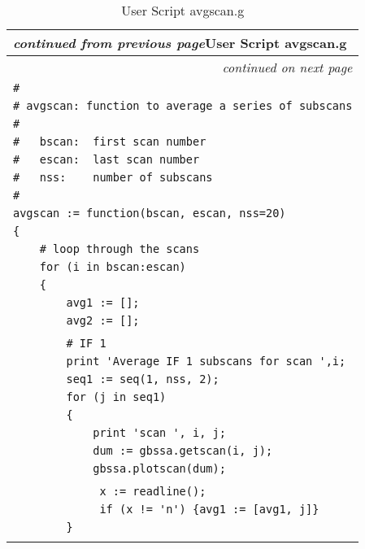 \setlongtables
\begin{longtable}[c]{|l|}
\caption{User Script avgscan.g}\label{avgscan} \\
\cline{1-1}
\endfirsthead
\multicolumn{1}{l}{\hspace{9mm}\footnotesize{\slshape
 continued from previous page}\hfill{User Script avgscan.g}} \\
\cline{1-1}
\endhead
\cline{1-1}
\multicolumn{1}{r}{\small \slshape
 continued on next page} \\
\endfoot
\cline{1-1}
\endlastfoot
{\slshape\small}
\verb|#   | \\
\verb|# avgscan: function to average a series of subscans| \\
\verb|#   | \\
\verb|#   bscan:  first scan number| \\
\verb|#   escan:  last scan number| \\
\verb|#   nss:    number of subscans| \\
\verb|#| \\
\verb|avgscan := function(bscan, escan, nss=20)| \\
\verb|{| \\
\verb|    # loop through the scans| \\
\verb|    for (i in bscan:escan)| \\
\verb|    {| \\
\verb|        avg1 := [];| \\
\verb|        avg2 := [];| \\
\verb|| \\
\verb|        # IF 1| \\
\verb|        print 'Average IF 1 subscans for scan ',i;| \\
\verb|        seq1 := seq(1, nss, 2);| \\
\verb|        for (j in seq1)| \\
\verb|        {| \\
\verb|            print 'scan ', i, j;| \\
\verb|            dum := gbssa.getscan(i, j);| \\
\verb|            gbssa.plotscan(dum);| \\
\verb|| \\
\verb|             x := readline();| \\
\verb|             if (x != 'n') {avg1 := [avg1, j]} | \\
\verb|        }| \\
\verb|| \\

\end{longtable}
